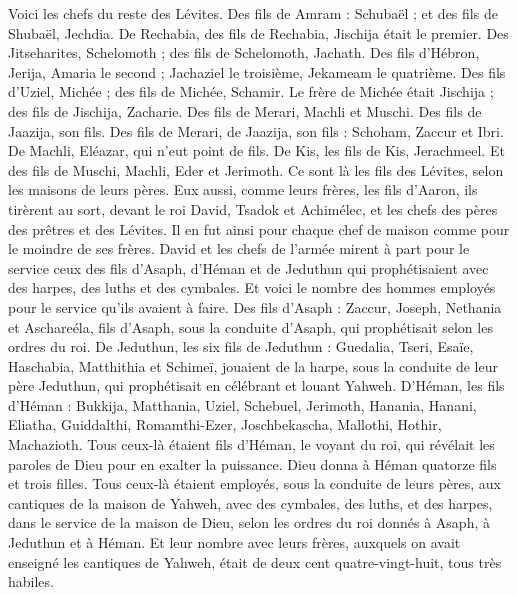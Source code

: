 \begin{multicols}{2}
Voici les chefs du reste des Lévites. Des fils de Amram : Schubaël ; et des fils de Shubaël, Jechdia.
De Rechabia, des fils de Rechabia, Jischija était le premier.
Des Jitseharites, Schelomoth ; des fils de Schelomoth, Jachath.
Des fils d'Hébron, Jerija, Amaria le second ; Jachaziel le troisième, Jekameam le quatrième.
Des fils d'Uziel, Michée ; des fils de Michée, Schamir.
Le frère de Michée était Jischija ; des fils de Jischija, Zacharie.
Des fils de Merari, Machli et Muschi. Des fils de Jaazija, son fils.
Des fils de Merari, de Jaazija, son fils : Schoham, Zaccur et Ibri.
De Machli, Eléazar, qui n'eut point de fils.
De Kis, les fils de Kis, Jerachmeel.
Et des fils de Muschi, Machli, Eder et Jerimoth. Ce sont là les fils des Lévites, selon les maisons de leurs pères.
Eux aussi, comme leurs frères, les fils d'Aaron, ils tirèrent au sort, devant le roi David, Tsadok et Achimélec, et les chefs des pères des prêtres et des Lévites. Il en fut ainsi pour chaque chef de maison comme pour le moindre de ses frères.
\VerseOne{}David et les chefs de l'armée mirent à part pour le service ceux des fils d'Asaph, d'Héman et de Jeduthun qui prophétisaient avec des harpes, des luths et des cymbales. Et voici le nombre des hommes employés pour le service qu'ils avaient à faire.
Des fils d'Asaph : Zaccur, Joseph, Nethania et Aschareéla, fils d'Asaph, sous la conduite d'Asaph, qui prophétisait selon les ordres du roi.
De Jeduthun, les six fils de Jeduthun : Guedalia, Tseri, Esaïe, Haschabia, Matthithia et Schimeï, jouaient de la harpe, sous la conduite de leur père Jeduthun, qui prophétisait en célébrant et louant Yahweh.
D'Héman, les fils d'Héman : Bukkija, Matthania, Uziel, Schebuel, Jerimoth, Hanania, Hanani, Eliatha, Guiddalthi, Romamthi-Ezer, Joschbekascha, Mallothi, Hothir, Machazioth.
Tous ceux-là étaient fils d'Héman, le voyant du roi, qui révélait les paroles de Dieu pour en exalter la puissance. Dieu donna à Héman quatorze fils et trois filles.
Tous ceux-là étaient employés, sous la conduite de leurs pères, aux cantiques de la maison de Yahweh, avec des cymbales, des luths, et des harpes, dans le service de la maison de Dieu, selon les ordres du roi donnés à Asaph, à Jeduthun et à Héman.
Et leur nombre avec leurs frères, auxquels on avait enseigné les cantiques de Yahweh, était de deux cent quatre-vingt-huit, tous très habiles.

\end{multicols}
